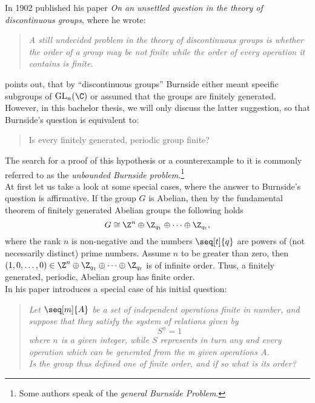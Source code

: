 In 1902 \textcite{burnside1902} published his paper \emph{On an unsettled question in the theory of discontinuous groups}, where he wrote:
\begin{quotation}
\textsl{
A still undecided problem in the theory of discontinuous groups is whether the order of a group may be not finite while the order of every operation it contains is finite.
}
\end{quotation}
\textcite{newman2004still} points out, that by ``discontinuous groups'' Burnside either meant specific subgroups of $\mathrm{GL}_n(\C)$ or assumed that the groups are finitely generated. However, in this bachelor thesis, we will only discuss the latter suggestion, so that Burnside's question is equivalent to:
\begin{quotation}
Is every finitely generated, periodic group finite?
\end{quotation}
The search for a proof of this hypothesis or a counterexample to it is commonly referred to as the \emph{unbounded Burnside problem.}\footnote{Some authors speak of the \emph{general Burnside Problem}.}\\
At first let us take a look at some special cases, where the answer to Burnside's question is affirmative. If the group $G$ is Abelian, then by the fundamental theorem of finitely generated Abelian groups the following holds
\begin{equation*}
G\cong\Z^n \oplus \Z_{q_1} \oplus \cdots \oplus \Z_{q_t},
\end{equation*}
where the rank $n$ is non-negative and the numbers $\seq[t]{q}$ are powers of (not necessarily distinct) prime numbers. Assume $n$ to be greater than zero, then $(1,0,\ldots,0)\in\Z^n \oplus \Z_{q_1} \oplus \cdots \oplus \Z_{q_t}$ is of infinite order. Thus, a finitely generated, periodic, Abelian group has finite order.\\
In his paper \textcite{burnside1902} introduces a special case of his initial question:
\begin{quotation}
\textsl{
Let $\seq[m]{A}$ be a set of independent operations finite in number, and suppose that they satisfy the system of relations given by
\begin{equation*}
S^n=1
\end{equation*}
where $n$ is a given integer, while $S$ represents in turn any and every operation which can be generated from the m given operations $A$.\\
Is the group thus defined one of finite order, and if so what is its order?}
\end{quotation}
